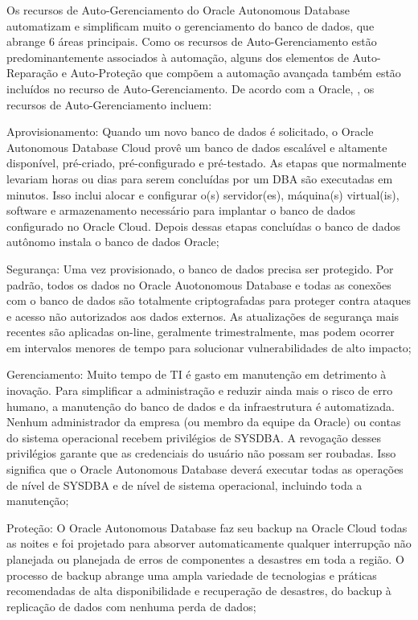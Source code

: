 Os recursos de Auto-Gerenciamento do Oracle Autonomous Database automatizam e simplificam muito o gerenciamento do banco de dados, que abrange 6 áreas principais. Como os recursos de Auto-Gerenciamento estão predominantemente associados à automação, alguns dos elementos de Auto-Reparação e Auto-Proteção que compõem a automação avançada também estão incluídos no recurso de Auto-Gerenciamento. De acordo com a Oracle, \cite{WPGestao}, os recursos de Auto-Gerenciamento incluem:

\begin{alineas}

\item Aprovisionamento: Quando um novo banco de dados é solicitado, o Oracle Autonomous Database Cloud provê um banco de dados escalável e altamente disponível, pré-criado, pré-configurado e pré-testado. As etapas que normalmente levariam horas ou dias para serem concluídas por um DBA são executadas em minutos. Isso inclui alocar e configurar o(s) servidor(es), máquina(s) virtual(is),  software e armazenamento necessário para implantar o banco de dados configurado no Oracle Cloud. Depois dessas etapas concluídas o banco de dados autônomo instala o banco de dados Oracle;

\item Segurança: Uma vez provisionado, o banco de dados precisa ser protegido. Por padrão, todos os dados no Oracle Auotonomous Database e todas as conexões com o banco de dados são totalmente criptografadas para proteger contra ataques e acesso não autorizados aos dados externos. As atualizações de segurança mais recentes são aplicadas on-line, geralmente trimestralmente, mas podem ocorrer em intervalos menores de tempo para solucionar vulnerabilidades de alto impacto;

\item Gerenciamento: Muito tempo de TI é gasto em manutenção em detrimento à inovação. Para simplificar a administração e reduzir ainda mais o risco de erro humano, a manutenção do banco de dados e da infraestrutura é automatizada. Nenhum administrador da empresa (ou membro da equipe da Oracle) ou contas do sistema operacional recebem privilégios de SYSDBA. A revogação desses privilégios garante que as credenciais do usuário não possam ser roubadas. Isso significa que o Oracle Autonomous Database deverá executar todas as operações de nível de SYSDBA e de nível de sistema operacional, incluindo toda a manutenção;

\item Proteção: O Oracle Autonomous Database faz seu backup na Oracle Cloud todas as noites e foi projetado para absorver automaticamente qualquer interrupção não planejada ou planejada de erros de componentes a desastres em toda a região. O processo de backup abrange uma ampla variedade de tecnologias e práticas recomendadas de alta disponibilidade e recuperação de desastres, do backup à replicação de dados com nenhuma perda de dados; 


\end{alineas}
